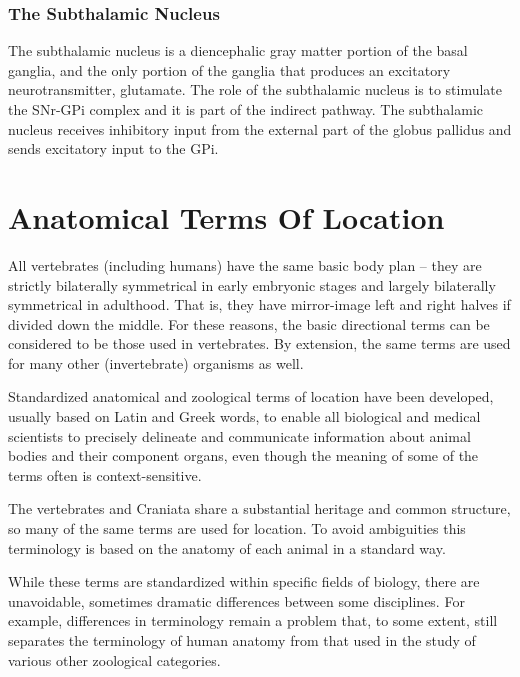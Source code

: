 \hypertarget{the-subthalamic-nucleus-1}{%
\subsection{The Subthalamic Nucleus}\label{the-subthalamic-nucleus-1}}

The subthalamic nucleus is a diencephalic gray matter portion of the basal ganglia, and the only portion of the ganglia that produces an excitatory neurotransmitter, glutamate. The role of the subthalamic nucleus is to stimulate the SNr-GPi complex and it is part of the indirect pathway. The subthalamic nucleus receives inhibitory input from the external part of the globus pallidus and sends excitatory input to the GPi.

\hypertarget{appendix-appendix}{%
\appendix}


\hypertarget{anatomical-terms-of-location}{%
\chapter{Anatomical Terms Of Location}\label{anatomical-terms-of-location}}

All vertebrates (including humans) have the same basic body plan -- they are strictly bilaterally symmetrical in early embryonic stages and largely bilaterally symmetrical in adulthood. That is, they have mirror-image left and right halves if divided down the middle. For these reasons, the basic directional terms can be considered to be those used in vertebrates. By extension, the same terms are used for many other (invertebrate) organisms as well.

Standardized anatomical and zoological terms of location have been developed, usually based on Latin and Greek words, to enable all biological and medical scientists to precisely delineate and communicate information about animal bodies and their component organs, even though the meaning of some of the terms often is context-sensitive.

The vertebrates and Craniata share a substantial heritage and common structure, so many of the same terms are used for location. To avoid ambiguities this terminology is based on the anatomy of each animal in a standard way.

While these terms are standardized within specific fields of biology, there are unavoidable, sometimes dramatic differences between some disciplines. For example, differences in terminology remain a problem that, to some extent, still separates the terminology of human anatomy from that used in the study of various other zoological categories.

